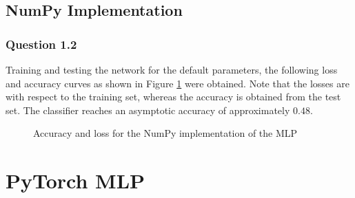 \documentclass{article}
\begin{document}
\subsection{NumPy Implementation}
\subsubsection*{Question 1.2}
Training and testing the network for the default parameters, the following loss and accuracy curves as shown in Figure \ref{fig:npcurves} were obtained. Note that the losses are with respect to the training set, whereas the accuracy is obtained from the test set. The classifier reaches an asymptotic accuracy of approximately $0.48$.
\begin{figure}[H]
	\centering
	\caption{Accuracy and loss for the NumPy implementation of the MLP}
	\label{fig:npcurves}
\end{figure}
\section{PyTorch MLP}
\end{document}
